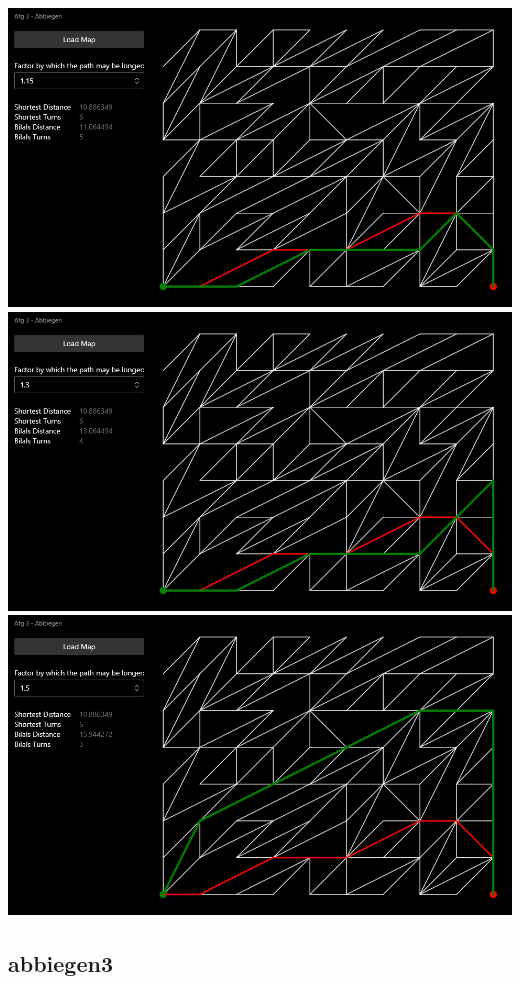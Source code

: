 \documentclass{article}
\begin{document}
\begin{center}
\includegraphics[width=\textwidth]{examples/2_15.png}
\includegraphics[width=\textwidth]{examples/2_30.png}
\includegraphics[width=\textwidth]{examples/2_50.png}
\end{center}

\subsection{abbiegen3}
\end{document}
